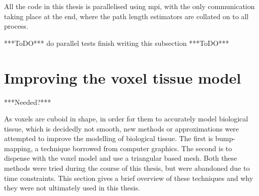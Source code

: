 All the code in this thesis is parallelised using \gls{mpi}, with the only communication taking place at the end, where the path length estimators are collated on to all process. 

***ToDO***
do parallel tests
finish writing this subsection
***ToDO***

\section{Improving the voxel tissue model}\label{sec:improve}

***Needed?***

As voxels are cuboid in shape, in order for them to accurately model biological tissue, which is decidedly not smooth, new methods or approximations were attempted to improve the modelling of biological tissue. 
The first is bump-mapping, a technique borrowed from computer graphics. The second is to dispense with the voxel model and use a triangular based mesh. Both these methods were tried during the course of this thesis, but were abandoned due to time constraints. This section gives a brief overview of these techniques and why they were not ultimately used in this thesis.
